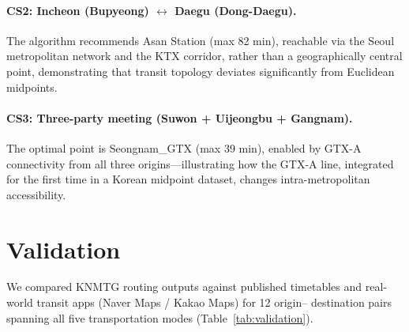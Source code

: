 \documentclass[12pt]{article}
\begin{document}
\paragraph{CS2: Incheon (Bupyeong) $\leftrightarrow$ Daegu (Dong-Daegu).}
The algorithm recommends Asan Station (max 82 min), reachable via
the Seoul metropolitan network and the KTX corridor, rather than
a geographically central point, demonstrating that transit topology
deviates significantly from Euclidean midpoints.

\paragraph{CS3: Three-party meeting (Suwon + Uijeongbu + Gangnam).}
The optimal point is Seongnam\_GTX (max 39 min), enabled by GTX-A
connectivity from all three origins—illustrating how the GTX-A
line, integrated for the first time in a Korean midpoint dataset,
changes intra-metropolitan accessibility.

\section{Validation}
\label{sec:validation}

We compared KNMTG routing outputs against published timetables and
real-world transit apps (Naver Maps / Kakao Maps) for 12 origin--
destination pairs spanning all five transportation modes
(Table~\ref{tab:validation}).
\end{document}
